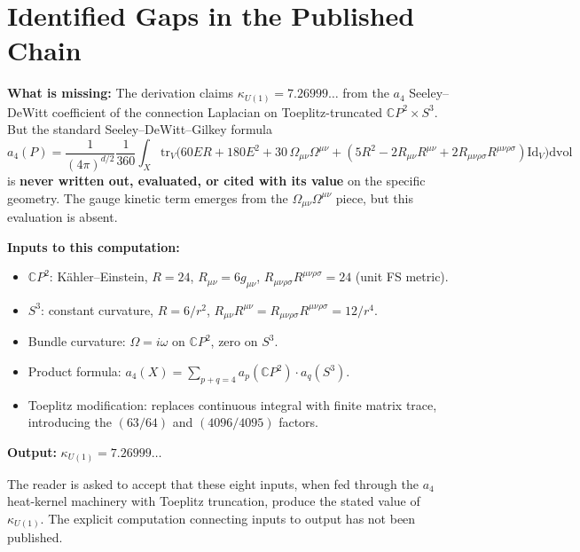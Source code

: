 \documentclass[12pt,a4paper]{article}
\begin{document}
\section{Identified Gaps in the Published Chain}
\label{sec:gaps}

\begin{tcolorbox}[colback=red!5!white,colframe=red!60!black,
title={GAP 1: The $a_4$ computation is never shown explicitly}]
\textbf{What is missing:} The derivation claims $\kappa_{U(1)} = 7.26999\ldots$
from the $a_4$ Seeley--DeWitt coefficient of the connection Laplacian on
Toeplitz-truncated $\mathbb{C}P^2 \times S^3$.  But the standard
Seeley--DeWitt--Gilkey formula
\begin{equation*}
a_4(P) = \frac{1}{(4\pi)^{d/2}} \frac{1}{360} \int_X \mathrm{tr}_V\!\Big(
60ER + 180E^2 + 30\,\Omega_{\mu\nu}\Omega^{\mu\nu}
+ (5R^2 - 2R_{\mu\nu}R^{\mu\nu} + 2R_{\mu\nu\rho\sigma}R^{\mu\nu\rho\sigma})\mathrm{Id}_V
\Big)\mathrm{dvol}
\end{equation*}
is \textbf{never written out, evaluated, or cited with its value} on the
specific geometry.  The gauge kinetic term emerges from the
$\Omega_{\mu\nu}\Omega^{\mu\nu}$ piece, but this evaluation is absent.

\textbf{Inputs to this computation:}
\begin{itemize}[nosep]
\item $\mathbb{C}P^2$: K\"ahler--Einstein, $R = 24$, $R_{\mu\nu} = 6g_{\mu\nu}$,
  $R_{\mu\nu\rho\sigma}R^{\mu\nu\rho\sigma} = 24$ (unit FS metric).
\item $S^3$: constant curvature, $R = 6/r^2$,
  $R_{\mu\nu}R^{\mu\nu} = R_{\mu\nu\rho\sigma}R^{\mu\nu\rho\sigma} = 12/r^4$.
\item Bundle curvature: $\Omega = i\omega$ on $\mathbb{C}P^2$, zero on $S^3$.
\item Product formula: $a_4(X) = \sum_{p+q=4} a_p(\mathbb{C}P^2) \cdot a_q(S^3)$.
\item Toeplitz modification: replaces continuous integral with finite matrix
  trace, introducing the $(63/64)$ and $(4096/4095)$ factors.
\end{itemize}

\textbf{Output:} $\kappa_{U(1)} = 7.26999\ldots$

The reader is asked to accept that these eight inputs, when fed through the
$a_4$ heat-kernel machinery with Toeplitz truncation, produce the stated
value of $\kappa_{U(1)}$.  The explicit computation connecting inputs to
output has not been published.
\end{tcolorbox}
\end{document}
